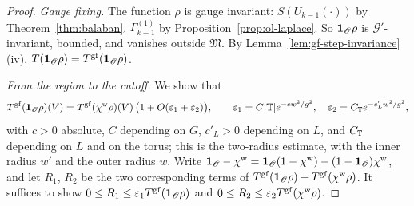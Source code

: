 \begin{proof}
\emph{Gauge fixing.} The function $\rho$ is gauge invariant: $S(U_{k-1}(\cdot))$ by Theorem~\ref{thm:balaban}, $\Gamma^{(1)}_{k-1}$ by Proposition~\ref{prop:ol-laplace}. So $\mathbf 1_{\mathscr O}\rho$ is $\mathcal G'$-invariant, bounded, and vanishes outside $\mathfrak M$. By Lemma~\ref{lem:gf-step-invariance}(iv), $T(\mathbf 1_{\mathscr O}\rho)=T^{\rm gf}(\mathbf 1_{\mathscr O}\rho)$.

\emph{From the region to the cutoff.} We show that
\[
T^{\rm gf}(\mathbf 1_{\mathscr O}\rho)(V)=T^{\rm gf}(\chi^{\rm w}\rho)(V)\,\big(1+O(\varepsilon_1+\varepsilon_2)\big),\qquad\varepsilon_1=C|\mathbb T|e^{-cw^2/g^2},\quad\varepsilon_2=C_\mathbb T e^{-c'_Lw^2/g^2},
\]
with $c>0$ absolute, $C$ depending on $G$, $c'_L>0$ depending on $L$, and $C_\mathbb T$ depending on $L$ and on the torus; this is the two-radius estimate, with the inner radius $w'$ and the outer radius $w$. Write $\mathbf 1_{\mathscr O}-\chi^{\rm w}=\mathbf 1_{\mathscr O}(1-\chi^{\rm w})-(1-\mathbf 1_{\mathscr O})\chi^{\rm w}$, and let $R_1$, $R_2$ be the two corresponding terms of $T^{\rm gf}(\mathbf 1_{\mathscr O}\rho)-T^{\rm gf}(\chi^{\rm w}\rho)$. It suffices to show $0\le R_1\le\varepsilon_1T^{\rm gf}(\mathbf 1_{\mathscr O}\rho)$ and $0\le R_2\le\varepsilon_2T^{\rm gf}(\chi^{\rm w}\rho)$.


\end{proof}
